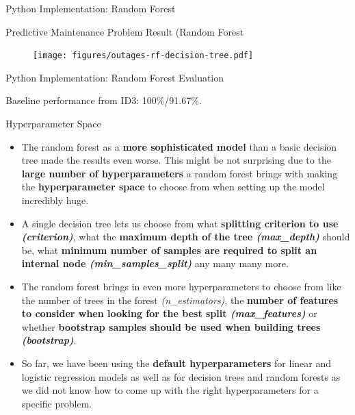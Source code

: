 \documentclass[document.tex]{subfiles}
\begin{document}
    \begin{frame}{Python Implementation: Random Forest}
        
    \end{frame}

    \begin{frame}{Predictive Maintenance Problem Result (Random Forest}
        \begin{figure}
            \label{fig:outages-rf-decision-tree}
            \texttt{[image: figures/outages-rf-decision-tree.pdf]}
        \end{figure}
    \end{frame}

    \begin{frame}{Python Implementation: Random Forest Evaluation}
        

        Baseline performance from ID3: 100\%/91.67\%.
    \end{frame}

    \begin{frame}{Hyperparameter Space}
        \begin{itemize}
            \item The random forest as a \textbf{more sophisticated model} than a basic decision tree made the results even worse. This might be not surprising due to the \textbf{large number of hyperparameters} a random forest brings with making the \textbf{hyperparameter space} to choose from when setting up the model incredibly huge.
            \item A single decision tree lets us choose from what \textbf{splitting criterion to use \textit{(criterion)}}, what the \textbf{maximum depth of the tree \textit{(max\_depth)}} should be, what \textbf{minimum number of samples are required to split an internal node \textit{(min\_samples\_split)}} any many many more.
            \item The random forest brings in even more hyperparameters to choose from like the number of trees in the forest \textit{(n\_estimators)}, the \textbf{number of features to consider when looking for the best split \textit{(max\_features)}} or whether \textbf{bootstrap samples should be used when building trees \textit{(bootstrap)}}.
            \item So far, we have been using the \textbf{default hyperparameters} for linear and logistic regression models as well as for decision trees and random forests as we did not know how to come up with the right hyperparameters for a specific problem.
        \end{itemize}

            
    \end{frame}
\end{document}
